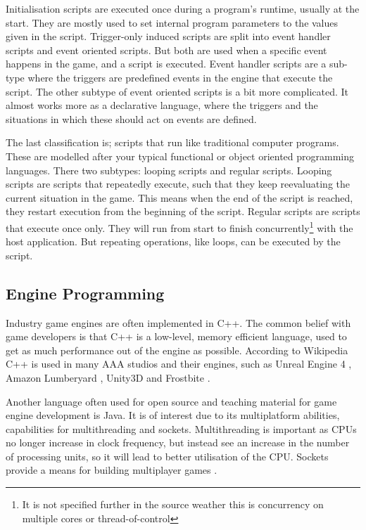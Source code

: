Initialisation scripts are executed once during a program's runtime, usually at the start.
They are mostly used to set internal program parameters to the values given in the script. Trigger-only induced scripts are split into event handler scripts and event oriented scripts. But both are used when a specific event happens in the game, and a script is executed. Event handler scripts are a sub-type where the triggers are predefined events in the engine that execute the script. The other subtype of event oriented scripts is a bit more complicated. It almost works more as a declarative language, where the triggers and the situations in which these should act on events are defined.%

The last classification is; scripts that run like traditional computer programs.
These are modelled after your typical functional or object oriented programming languages.
There two subtypes: looping scripts and regular scripts.
Looping scripts are scripts that repeatedly execute, such that they keep reevaluating the current situation in the game. This means when the end of the script is reached, they restart execution from the beginning of the script. Regular scripts are scripts that execute once only. They will run from start to finish concurrently\footnote{It is not specified further in the source weather this is concurrency on multiple cores or thread-of-control} with the host application. But repeating operations, like loops, can be executed by the script\cite{5962102}.

\subsection{Engine Programming} \label{sec:engine:programming}
Industry game engines are often implemented in C++. The common belief with game developers is that C++ is a low-level, memory efficient language, used to get as much performance out of the engine as possible\cite{gamasutra:c++functional}. According to Wikipedia C++ is used in many AAA studios and their engines, such as Unreal Engine 4 \cite{EpicGamesRepo}, Amazon Lumberyard \cite{awsRepo}, Unity3D \cite{wiki:Unity3D} and Frostbite \cite{wiki:Frostbite}.

Another language often used for open source and teaching material for game engine development is Java\cite{Java:Gamedev-tutorials}. It is of interest due to its multiplatform abilities, capabilities for multithreading and sockets\cite{amador2014jot}. Multithreading is important as \acp{CPU} no longer increase in clock frequency, but instead see an increase in the number of processing units, so it will lead to better utilisation of the \ac{CPU}\cite{Pfeffer2004}. Sockets provide a means for building multiplayer games \cite{freelancer:EngineLanguages}.

